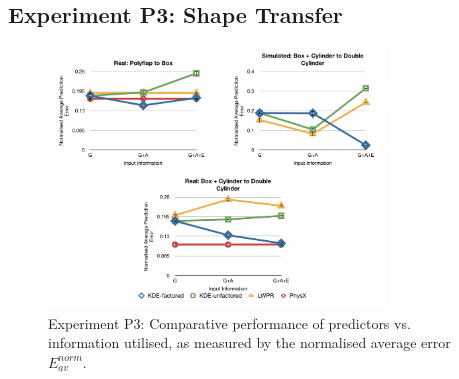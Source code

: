 \subsection{Experiment P3:  Shape Transfer}\label{sec:Results.Shape}
\begin{figure}[t]
\centerline{\includegraphics[width=0.8\textwidth]{graphs_jw/P3-graphs}}
\caption{Experiment P3: Comparative performance of predictors vs. information utilised, as measured by the normalised average error ${E_{av}^{norm}}$. 
}\label{fig:S_av_graphs}
\end{figure}
\newlength{\imgCXwid}
\setlength{\imgCXwid}{2.2cm}

